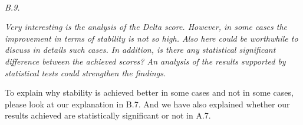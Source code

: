 \documentclass[conference]{IEEEtran}
\begin{document}
\noindent
\textit{\\B.9.} 

\textit{Very interesting is the analysis of the Delta score. However, in some cases the improvement in terms of stability is not so high. Also here could be worthwhile to discuss in details such cases. In addition, is there any statistical significant difference between the achieved scores? An analysis of the results supported by statistical tests could strengthen the findings.\\}

To explain why stability is achieved better in some cases and not in some cases, please look at our explanation in B.7. And we have also explained whether our results achieved are statistically significant or not in A.7.


\medskip

\end{document}
